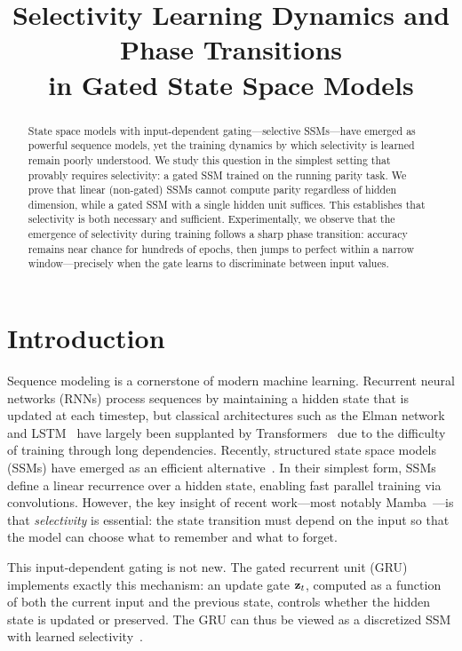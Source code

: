 \documentclass[11pt]{article}
\title{Selectivity Learning Dynamics and Phase Transitions \\ in Gated State Space Models}
\author{}
\date{}
\begin{document}
\maketitle

\begin{abstract}
State space models with input-dependent gating---\ie selective SSMs---have emerged as powerful sequence models, yet the training dynamics by which selectivity is learned remain poorly understood.
We study this question in the simplest setting that provably requires selectivity: a gated SSM trained on the running parity task.
We prove that linear (non-gated) SSMs cannot compute parity regardless of hidden dimension, while a gated SSM with a single hidden unit suffices.
This establishes that selectivity is both necessary and sufficient.
Experimentally, we observe that the emergence of selectivity during training follows a sharp phase transition: accuracy remains near chance for hundreds of epochs, then jumps to perfect within a narrow window---precisely when the gate learns to discriminate between input values.
\end{abstract}

\section{Introduction}
\label{sec:intro}

Sequence modeling is a cornerstone of modern machine learning.
Recurrent neural networks (RNNs) process sequences by maintaining a hidden state that is updated at each timestep, but classical architectures such as the Elman network and LSTM~\citep{hochreiter1997long} have largely been supplanted by Transformers~\citep{vaswani2017attention} due to the difficulty of training through long dependencies.
Recently, structured state space models (SSMs) have emerged as an efficient alternative~\citep{gu2022efficiently}.
In their simplest form, SSMs define a linear recurrence over a hidden state, enabling fast parallel training via convolutions.
However, the key insight of recent work---most notably Mamba~\citep{gu2023mamba}---is that \emph{selectivity} is essential: the state transition must depend on the input so that the model can choose what to remember and what to forget.

This input-dependent gating is not new. The gated recurrent unit (GRU)~\citep{cho2014learning} implements exactly this mechanism: an update gate $\mathbf{z}_t$, computed as a function of both the current input and the previous state, controls whether the hidden state is updated or preserved.
The GRU can thus be viewed as a discretized SSM with learned selectivity~\citep{gu2023mamba, orvieto2023resurrecting}.
\end{document}

